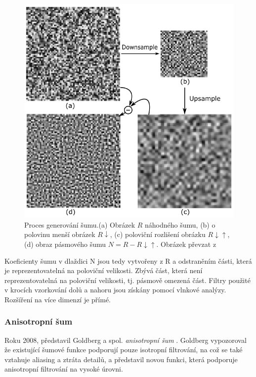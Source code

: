 \begin{figure}[H]
	\centering
	\includegraphics[scale=0.9]{obrazky-figures/WaveletNoise.pdf}
	\caption{Proces generování šumu.(a) Obrázek $R$ náhodného šumu, (b) o polovinu menší obrázek $R\downarrow$, (c) poloviční rozlišení obrázku $R{\downarrow\uparrow}$, (d) obraz pásmového šumu $N = R-R{\downarrow\uparrow}$. Obrázek převzat z \cite{Cook05}}
	\label{fig:WaveletNoise}
\end{figure}

Koeficienty šumu v dlaždici N jsou tedy vytvořeny z R a odstraněním části, která je reprezentovatelná na poloviční velikosti. Zbývá část, která není reprezentovatelná na poloviční velikosti, tj. pásmově omezená část. Filtry použité v krocích vzorkování dolů a nahoru jsou získány pomocí vlnkové analýzy. Rozšíření na více dimenzí je přímé.

\subsubsection{Anisotropní šum}
\label{AnisotropNoise}
Roku 2008, představil Goldberg a spol. \textit{anisotropní šum} \cite{Goldberg08}. Goldberg vypozoroval že existující šumové funkce podporují pouze isotropní filtrování, na což se také vztahuje aliasing a ztráta detailů, a představil novou funkci, která podporuje anisotropní filtrování na vysoké úrovni.

